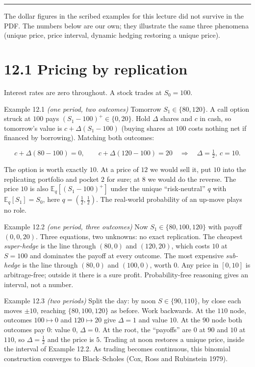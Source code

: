 \documentclass[11pt,a4paper,openany]{book}
\newcommand{\E}{\mathbb{E}}
\newenvironment{marginnote}{\par\medskip\noindent\color{muted}\small\sffamily\rule{\linewidth}{0.4pt}\par}{\par\medskip}
\begin{document}
\begin{marginnote}
The dollar figures in the scribed examples for this lecture did not survive in the PDF. The numbers below are our own; they illustrate the same three phenomena (unique price, price interval, dynamic hedging restoring a unique price).
\end{marginnote}

\section*{12.1 Pricing by replication}\label{ch12-trees}

Interest rates are zero throughout. A stock trades at $S_0=100$.

\begin{bexample}{Example 12.1 \emph{(one period, two outcomes)}}
Tomorrow $S_1\in\{80,120\}$. A call option struck at $100$ pays $(S_1-100)^+\in\{0,20\}$. Hold $\Delta$ shares and $c$ in cash, so tomorrow's value is $c+\Delta(S_1-100)$ (buying shares at $100$ costs nothing net if financed by borrowing). Matching both outcomes:

\[c+\Delta(80-100)=0,\qquad c+\Delta(120-100)=20\quad\Longrightarrow\quad\Delta=\tfrac12,\ c=10.\]

The option is worth exactly $10$. At a price of $12$ we would sell it, put $10$ into the replicating portfolio and pocket $2$ for sure; at $8$ we would do the reverse. The price $10$ is also $\E_q[(S_1-100)^+]$ under the unique ``risk-neutral'' $q$ with $\E_q[S_1]=S_0$, here $q=(\tfrac12,\tfrac12)$. The real-world probability of an up-move plays no role.
\end{bexample}

\begin{bexample}{Example 12.2 \emph{(one period, three outcomes)}}
Now $S_1\in\{80,100,120\}$ with payoff $(0,0,20)$. Three equations, two unknowns: no exact replication. The cheapest \emph{super-hedge} is the line through $(80,0)$ and $(120,20)$, which costs $10$ at $S=100$ and dominates the payoff at every outcome. The most expensive \emph{sub-hedge} is the line through $(80,0)$ and $(100,0)$, worth $0$. Any price in $[0,10]$ is arbitrage-free; outside it there is a sure profit. Probability-free reasoning gives an interval, not a number.
\end{bexample}

\begin{bexample}{Example 12.3 \emph{(two periods)}}
Split the day: by noon $S\in\{90,110\}$, by close each moves $\pm10$, reaching $\{80,100,120\}$ as before. Work backwards. At the $110$ node, outcomes $100\mapsto0$ and $120\mapsto20$ give $\Delta=1$ and value $10$. At the $90$ node both outcomes pay $0$: value $0$, $\Delta=0$. At the root, the ``payoffs'' are $0$ at $90$ and $10$ at $110$, so $\Delta=\tfrac12$ and the price is $5$. Trading at noon restores a unique price, inside the interval of Example 12.2. As trading becomes continuous, this binomial construction converges to Black–Scholes (Cox, Ross and Rubinstein 1979).
\end{bexample}
\end{document}
